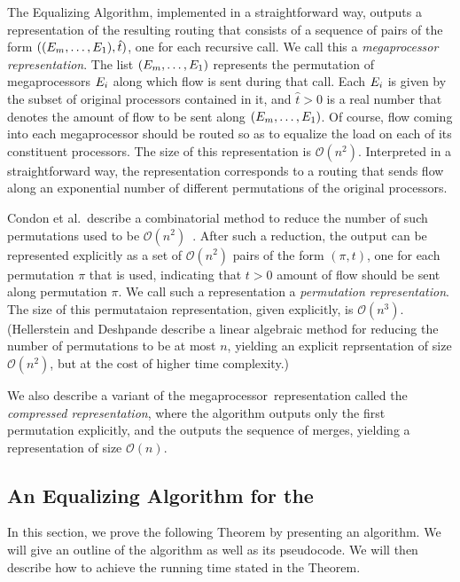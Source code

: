 \documentclass{article}
\newcommand{\ens}[1]{\ensuremath{#1}}					\newcommand{\card}[1]{\ens{|#1|}}							\newcommand{\dotlist}[2]{\ens{#1,\ldots,#2}}
\newcommand{\bigoh}[1]{\ens{\mathcal{O}(#1)}}				\newcommand{\bigom}[1]{\ens{\Omega(#1)}}
\newcommand{\valn}{\ens{n}}
\newcommand{\processor}{processor}
\newcommand{\megaprocessor}{mega\processor}
\begin{document}
The Equalizing Algorithm, implemented in a straightforward way, 
outputs a representation of the resulting routing that consists
of a sequence of pairs of the form 
$((\dotlist{\megaop m}{\megaop 1}),\hat{t})$,
one for each
recursive call.    We call this a {\em {\megaprocessor} representation}.
The list 
$(\dotlist{\megaop m}{\megaop 1})$
represents the permutation
of \megaprocessor s $\megaop i$ along which flow is sent during that call.
Each $\megaop i$ is given by the subset of original processors contained in it,
and $\hat{t} > 0$ is a real number that
denotes the amount of flow to be sent along 
$(\dotlist{\megaop m}{\megaop 1})$.
Of course, flow coming into each {\megaprocessor} should be routed so as to
equalize the load on each of its constituent {\processor}s.
The size of this representation is $\bigoh{\valn^2}$.
Interpreted in a straightforward way, the representation corresponds
to a routing
that sends flow along an exponential number of different
permutations of the original {\processor}s.

Condon et al.~describe a combinatorial method to reduce the number of 
such permutations used to
be $\bigoh{n^2}$~\cite{journals/talg/CondonDHW09}.  After such a reduction,
the output can be represented explicitly as a set of $\bigoh{n^2}$ 
pairs of the form
$(\pi, t)$, one for each permutation $\pi$ that is used,
indicating that $t > 0$ amount of flow should be sent along permutation
$\pi$.   We call such a representation a {\em permutation  representation}.
The size of this permutataion representation, given explicitly, is $\bigoh{n^3}$. (Hellerstein and Deshpande
describe a linear algebraic method for reducing the number of permutations to be
at most $n$, yielding an explicit reprsentation of size $\bigoh{n^2}$, but at the
cost of higher time complexity\cite{DBLP:journals/talg/DeshpandeH12}.)

We also describe a variant of the \megaprocessor\ representation called the \textit{compressed representation}, where the algorithm outputs only the first permutation explicitly, and the outputs the sequence of merges, yielding a representation of size \bigoh n.

\subsection{An Equalizing Algorithm for the \cmt}

In this section, we prove the following Theorem by presenting an algorithm. We will give an outline of the algorithm as well as its pseudocode. We will then describe how to achieve the running time stated in the Theorem. 
\end{document}
